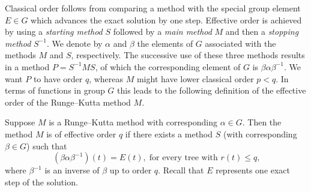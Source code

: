 Classical order follows from comparing a method with the special group
element $E \in G$ which advances the exact solution by one step.
Effective order is achieved by using a \emph{starting method} $S$
followed by a \emph{main method} $M$
and then a \emph{stopping method} $S^{-1}$.
We denote by $\alpha$ and $\beta$ the elements of $G$ associated with the methods $M$ and $S$, respectively.
The successive use of these three methods results in a method $P = S^{-1}MS$, of which the corresponding element of $G$ is $\beta\alpha\beta^{-1}$.
We want $P$ to have order $q$, whereas $M$ might have lower classical
order $p < q$.
In terms of functions in group $G$ this leads to the following definition of the effective order of the Runge--Kutta method $M$.
\begin{definition}\cite[Section~389]{Butcher2008_book}\label{def:Effective_order}
  Suppose $M$ is a Runge--Kutta method with corresponding $\alpha \in G$.
  Then the method $M$ is of effective order $q$ if there exists a method
  $S$ (with corresponding $\beta \in G$) such that
	\begin{equation}\label{eq:Effective_order_1}
		(\beta\alpha\beta^{-1})(t) = E(t), \; \text{for every tree with $r(t) \leq q$,}
	\end{equation}
        where $\beta^{-1}$ is an inverse of $\beta$ up to order $q$.
        Recall that $E$ represents one exact step of the solution.
\end{definition}
